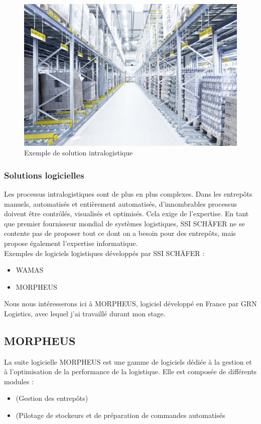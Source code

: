 \documentclass[a4paper, 12pt, french]{article}
\newcommand{\bdot}{\item[\color{ssiYellow}\ding{108}]}
\begin{document}
			\begin{figure}[h!]
				\begin{center}
					\includegraphics[width=0.7\linewidth]{images/intralogistic.jpg}
				\end{center}
				\caption{Exemple de solution intralogistique}
				\label{fig:intralogistic}
			\end{figure}	
	
			\subsubsection{Solutions logicielles}
	Les processus intralogistiques sont de plus en plus complexes. Dans les entrepôts manuels, automatisés et entièrement automatisés, d'innombrables processus doivent être contrôlés, visualisés et optimisés. Cela exige de l'expertise. En tant que premier fournisseur mondial de systèmes logistiques, SSI SCHÄFER ne se contente pas de proposer tout ce dont on a besoin pour des entrepôts, mais propose également l'expertise informatique.\\

				\noindent
				Exemples de logiciels logistiques développés par SSI SCHÄFER :
				\begin{itemize}
					\bdot{WAMAS}
					\bdot{MORPHEUS}
				\end{itemize}
				\vspace{\baselineskip}
				\par Nous nous intéresserons ici à MORPHEUS, logiciel développé en France par GRN Logistics, avec lequel j'ai travaillé durant mon stage.
		\subsection{MORPHEUS}
	La suite logicielle MORPHEUS est une gamme de logiciels dédiée à la gestion et à l'optimisation de la performance de la logistique. Elle est composée de différents modules :
			\begin{itemize}
				\bdot{ (Gestion des entrepôts)}
				\bdot{ (Pilotage de stockeurs et de préparation de commandes automatisés}
			\end{itemize}
\end{document}
